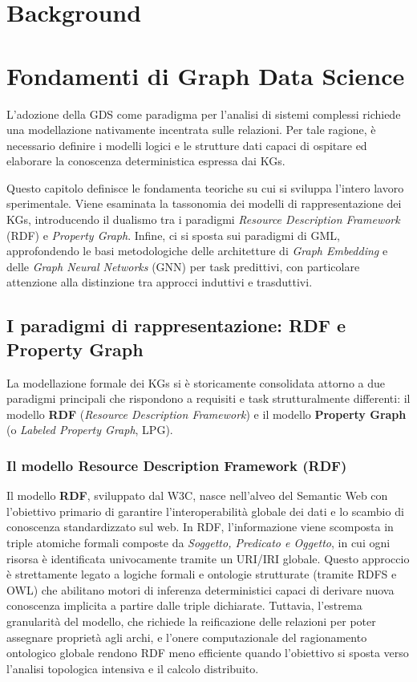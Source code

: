 {\chapter{Background}}
{\chapter{Fondamenti di Graph Data Science}}
\label{sec:sota}
L'adozione della GDS come paradigma per l'analisi di sistemi complessi richiede una modellazione nativamente incentrata sulle relazioni. Per tale ragione, è  necessario definire i modelli logici e le strutture dati capaci di ospitare ed elaborare la conoscenza deterministica espressa dai KGs.

Questo capitolo definisce le fondamenta teoriche su cui si sviluppa l'intero lavoro sperimentale. Viene esaminata la tassonomia dei modelli di rappresentazione dei KGs, introducendo il dualismo tra i paradigmi \textit{Resource Description Framework} (RDF) e \textit{Property Graph}. Infine, ci si sposta sui paradigmi di GML, approfondendo le basi metodologiche delle architetture di \textit{Graph Embedding} e delle \textit{Graph Neural Networks} (GNN) per task predittivi, con particolare attenzione alla distinzione tra approcci induttivi e trasduttivi.

\section{I paradigmi di rappresentazione: RDF e Property Graph}
La modellazione formale dei KGs si è storicamente consolidata attorno a due paradigmi principali che rispondono a requisiti e task strutturalmente differenti: il modello \textbf{RDF} (\textit{Resource Description Framework}) e il modello \textbf{Property Graph} (o \textit{Labeled Property Graph}, LPG).

\subsection{Il modello Resource Description Framework (RDF)}
Il modello \textbf{RDF}, sviluppato dal  W3C, nasce nell'alveo del Semantic Web con l'obiettivo primario di garantire l'interoperabilità globale dei dati e lo scambio di conoscenza standardizzato sul web. In RDF, l'informazione viene scomposta in triple atomiche formali composte da \textit{Soggetto, Predicato e Oggetto}, in cui ogni risorsa è identificata univocamente tramite un URI/IRI globale. Questo approccio è strettamente legato a logiche formali e ontologie strutturate (tramite RDFS e OWL) che abilitano motori di inferenza deterministici capaci di derivare nuova conoscenza implicita a partire dalle triple dichiarate. Tuttavia, l'estrema granularità del modello, che richiede la reificazione delle relazioni per poter assegnare proprietà agli archi, e l'onere computazionale del ragionamento ontologico globale rendono RDF meno efficiente quando l'obiettivo si sposta verso l'analisi topologica intensiva e il calcolo distribuito.


